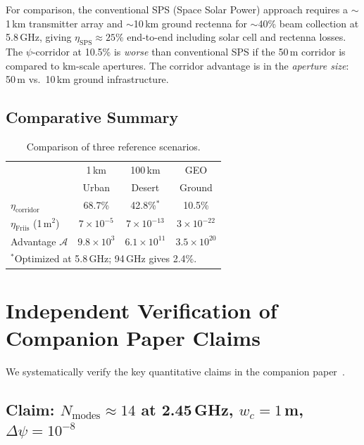 \documentclass[journal,twocolumn]{IEEEtran}
\begin{document}
For comparison, the conventional SPS (Space Solar Power) approach
requires a $\sim$1\,km transmitter array and $\sim$10\,km ground
rectenna for $\sim$40\% beam collection at 5.8\,GHz, giving
$\eta_\text{SPS} \approx 25\%$ end-to-end including solar cell and
rectenna losses. The $\psi$-corridor at 10.5\% is \emph{worse} than
conventional SPS if the 50\,m corridor is compared to km-scale
apertures. The corridor advantage is in the \emph{aperture size}:
50\,m vs.\ 10\,km ground infrastructure.

\subsection{Comparative Summary}

\begin{table}[h]
\caption{Comparison of three reference scenarios.}
\label{tab:comparison}
\centering
\begin{tabular}{lccc}
\toprule
& 1\,km & 100\,km & GEO \\
& Urban & Desert & Ground \\
\midrule
$\eta_\text{corridor}$ & 68.7\% & 42.8\%$^*$ & 10.5\% \\
$\eta_\text{Friis}$ (1\,m$^2$) & $7\times10^{-5}$ & $7\times10^{-13}$ & $3\times10^{-22}$ \\
Advantage $\mathcal{A}$ & $9.8\times10^3$ & $6.1\times10^{11}$ & $3.5\times10^{20}$ \\
\bottomrule
\multicolumn{4}{l}{\small $^*$Optimized at 5.8\,GHz; 94\,GHz gives 2.4\%.}
\end{tabular}
\end{table}

\section{Independent Verification of Companion Paper Claims}
\label{sec:verification}

We systematically verify the key quantitative claims in the companion
paper~\cite{Alcock2025_P4}.

\subsection{Claim: $N_\text{modes} \approx 14$ at 2.45\,GHz,
$w_c = 1$\,m, $\Delta\psi = 10^{-8}$}
\end{document}
